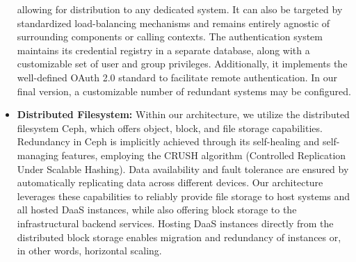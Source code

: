 \documentclass[runningheads]{llncs}
\begin{document}
\begin{itemize}
	      allowing for distribution to any dedicated system.
	      It can also be targeted by standardized load-balancing mechanisms
	      and remains entirely agnostic of surrounding components
	      or calling contexts.
	      The authentication system maintains its credential registry
	      in a separate database, along with a customizable set
	      of user and group privileges.
	      Additionally, it implements the well-defined OAuth 2.0 standard
	      to facilitate remote authentication.
	      In our final version,
	      a customizable number of redundant systems may be configured.
	\item \textbf{Distributed Filesystem:}
	      Within our architecture, we utilize the distributed filesystem Ceph,
	      which offers object, block, and file storage capabilities.
	      Redundancy in Ceph is implicitly achieved
	      through its self-healing and self-managing features, employing
	      the CRUSH algorithm (Controlled Replication Under Scalable Hashing).
	      Data availability and fault tolerance are ensured
	      by automatically replicating data across different devices.
	      Our architecture leverages these capabilities
	      to reliably provide file storage to host systems
	      and all hosted DaaS instances,
	      while also offering block storage to the infrastructural backend services.
	      Hosting DaaS instances directly from the distributed block storage
	      enables migration and redundancy of instances or, in other words, horizontal scaling.
\end{itemize}
\end{document}
